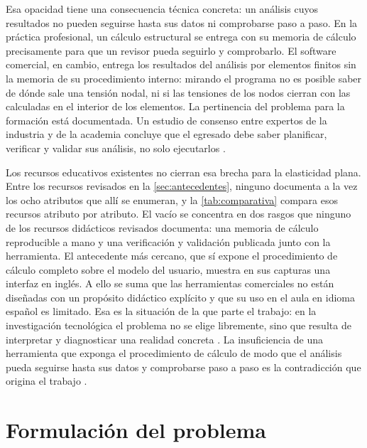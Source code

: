 Esa opacidad tiene una consecuencia técnica concreta: un análisis cuyos resultados no pueden seguirse hasta sus datos ni comprobarse paso a paso. En la práctica profesional, un cálculo estructural se entrega con su memoria de cálculo precisamente para que un revisor pueda seguirlo y comprobarlo. El software comercial, en cambio, entrega los resultados del análisis por elementos finitos sin la memoria de su procedimiento interno: mirando el programa no es posible saber de dónde sale una tensión nodal, ni si las tensiones de los nodos cierran con las calculadas en el interior de los elementos. La pertinencia del problema para la formación está documentada. Un estudio de consenso entre expertos de la industria y de la academia concluye que el egresado debe saber planificar, verificar y validar sus análisis, no solo ejecutarlos \autocite[pp.~1159, 1171]{perezsantiago2023fem}.

Los recursos educativos existentes no cierran esa brecha para la elasticidad plana. Entre los recursos revisados en la \autoref{sec:antecedentes}, ninguno documenta a la vez los ocho atributos que allí se enumeran, y la \autoref{tab:comparativa} compara esos recursos atributo por atributo. El vacío se concentra en dos rasgos que ninguno de los recursos didácticos revisados documenta: una memoria de cálculo reproducible a mano y una verificación y validación publicada junto con la herramienta. El antecedente más cercano, que sí expone el procedimiento de cálculo completo sobre el modelo del usuario, muestra en sus capturas una interfaz en inglés. A ello se suma que las herramientas comerciales no están diseñadas con un propósito didáctico explícito \autocite[p.~1160]{perezsantiago2023fem} y que su uso en el aula en idioma español es limitado. Esa es la situación de la que parte el trabajo: en la investigación tecnológica el problema no se elige libremente, sino que resulta de interpretar y diagnosticar una realidad concreta \autocite[p.~83]{garciacordoba2005tecnologica}. La insuficiencia de una herramienta que exponga el procedimiento de cálculo de modo que el análisis pueda seguirse hasta sus datos y comprobarse paso a paso es la contradicción que origina el trabajo \autocite[pp.~7, 14]{alvarez_metodologia}.

\section*{Formulación del problema}

